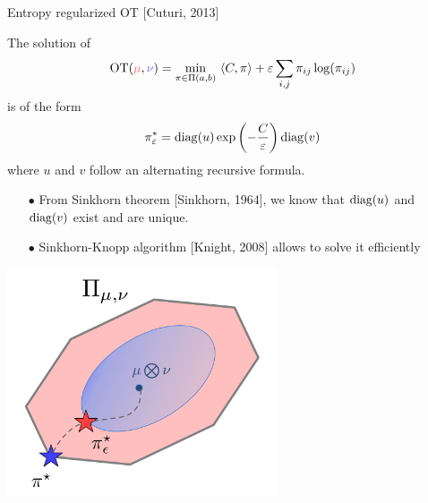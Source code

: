 \documentclass[pdf,aspectratio=169,10pt]{beamer}
\begin{document}
\begin{frame}{Entropy regularized OT [Cuturi, 2013]}
\begin{block}{}
The solution of 
$$\OT(\er{\mu},\eb{\nu}) = \min_{\pi\in\Pi(a,b)} \ \langle C,\pi\rangle + \varepsilon \sum_{i,j} \pi_{ij}\log(\pi_{ij})$$
is of the form
$$\pi_\varepsilon^* = \mathop{\rm diag}\nolimits(u)\exp\left(-\frac{C}{\varepsilon}\right)\mathop{\rm diag}\nolimits(v)$$
where $u$ and $v$ follow an alternating recursive formula. 
\end{block}
\begin{minipage}{0.5\textwidth}
   {\vspace{0.3cm}
\begin{itemize}
\item[$\bullet$] From Sinkhorn theorem [Sinkhorn, 1964], we know that $\mathop{\rm diag}\nolimits(u)$ and $\mathop{\rm diag}\nolimits(v)$ exist and are unique.
\item[$\bullet$] Sinkhorn-Knopp algorithm [Knight, 2008] allows to solve it efficiently
\end{itemize}} 
\end{minipage}
\hfill
\begin{minipage}{0.49\textwidth}
\centering
        \includegraphics[width=0.6\textwidth]{../img/polytope2.pdf}\hspace{2em}
\end{minipage}



\end{frame}
\end{document}
